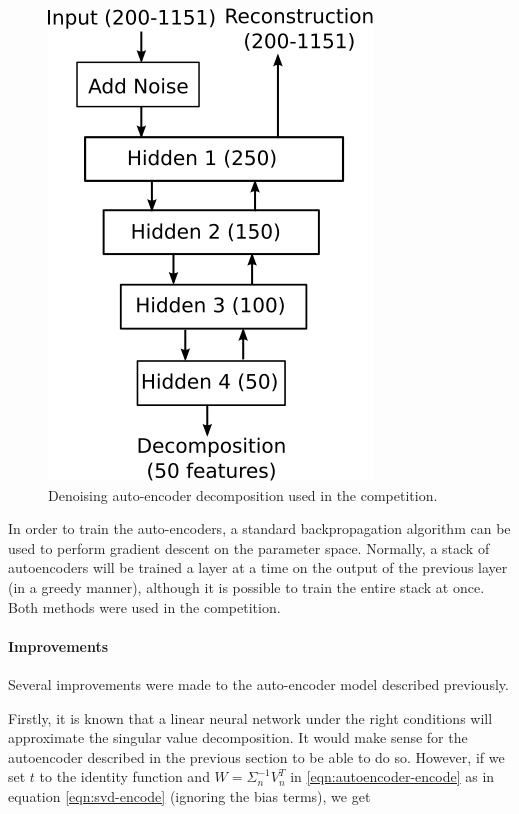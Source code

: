 \documentclass{article}
\begin{document}
\begin{figure}[ht]
\vskip 0.2in
\begin{center}
\centerline{\includegraphics{auto-encoder}}
\caption{Denoising auto-encoder decomposition used in the competition.}
\label{fig:autoencoder-decomposition}
\end{center}
\vskip -0.2in
\end{figure} 

In order to train the auto-encoders, a standard backpropagation algorithm can be used to perform gradient descent on the parameter space.  Normally, a stack of autoencoders will be trained a layer at a time on the output of the previous layer (in a greedy manner), although it is possible to train the entire stack at once.  Both methods were used in the competition.

\paragraph{Improvements}

Several improvements were made to the auto-encoder model described previously.

Firstly, it is known that a linear neural network under the right conditions will approximate the singular value decomposition.  It would make sense for the autoencoder described in the previous section to be able to do so.  However, if we set $t$ to the identity function and $W = \Sigma_n^{-1} V_n^T$ in \ref{eqn:autoencoder-encode} as in equation \ref{eqn:svd-encode} (ignoring the bias terms), we get
\end{document}
